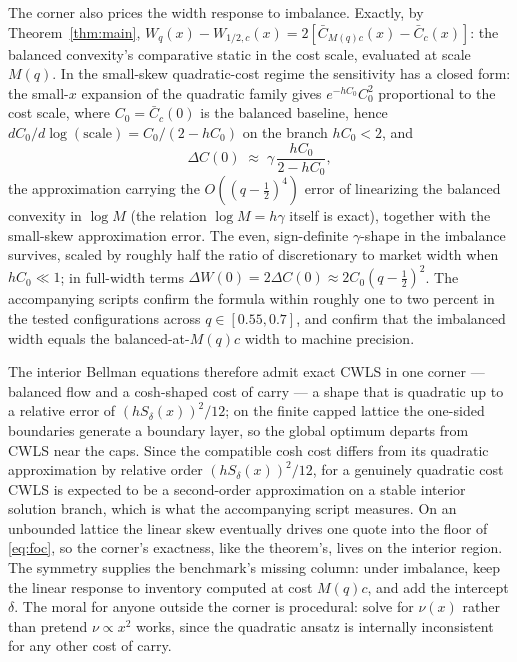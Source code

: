 \documentclass[11pt]{article}
\begin{document}
The corner also prices the width response to imbalance. Exactly, by Theorem~\ref{thm:main}, $W_q(x) - W_{1/2,c}(x) = 2[\bar C_{M(q)c}(x) - \bar C_c(x)]$: the balanced convexity's comparative static in the cost scale, evaluated at scale $M(q)$. In the small-skew quadratic-cost regime the sensitivity has a closed form: the small-$x$ expansion of the quadratic family gives $e^{-hC_0}C_0^2$ proportional to the cost scale, where $C_0 = \bar C_c(0)$ is the balanced baseline, hence $dC_0/d\log(\mathrm{scale}) = C_0/(2 - hC_0)$ on the branch $hC_0 < 2$, and
\begin{equation}
\Delta C(0) \;\approx\; \gamma\,\frac{hC_0}{2 - hC_0},
\label{eq:widthresponse}
\end{equation}
the approximation carrying the $O((q-\tfrac12)^4)$ error of linearizing the balanced convexity in $\log M$ (the relation $\log M = h\gamma$ itself is exact), together with the small-skew approximation error. The even, sign-definite $\gamma$-shape in the imbalance survives, scaled by roughly half the ratio of discretionary to market width when $hC_0 \ll 1$; in full-width terms $\Delta W(0) = 2\Delta C(0) \approx 2C_0(q - \tfrac12)^2$. The accompanying scripts confirm the formula within roughly one to two percent in the tested configurations across $q \in [0.55, 0.7]$, and confirm that the imbalanced width equals the balanced-at-$M(q)c$ width to machine precision.

The interior Bellman equations therefore admit exact CWLS in one corner --- balanced flow and a cosh-shaped cost of carry --- a shape that is quadratic up to a relative error of $(hS_\delta(x))^{2}/12$; on the finite capped lattice the one-sided boundaries generate a boundary layer, so the global optimum departs from CWLS near the caps. Since the compatible cosh cost differs from its quadratic approximation by relative order $(hS_\delta(x))^{2}/12$, for a genuinely quadratic cost CWLS is expected to be a second-order approximation on a stable interior solution branch, which is what the accompanying script measures. On an unbounded lattice the linear skew eventually drives one quote into the floor of \eqref{eq:foc}, so the corner's exactness, like the theorem's, lives on the interior region. The symmetry supplies the benchmark's missing column: under imbalance, keep the linear response to inventory computed at cost $M(q)c$, and add the intercept $\delta$. The moral for anyone outside the corner is procedural: solve for $\nu(x)$ rather than pretend $\nu \propto x^2$ works, since the quadratic ansatz is internally inconsistent for any other cost of carry.
\end{document}
